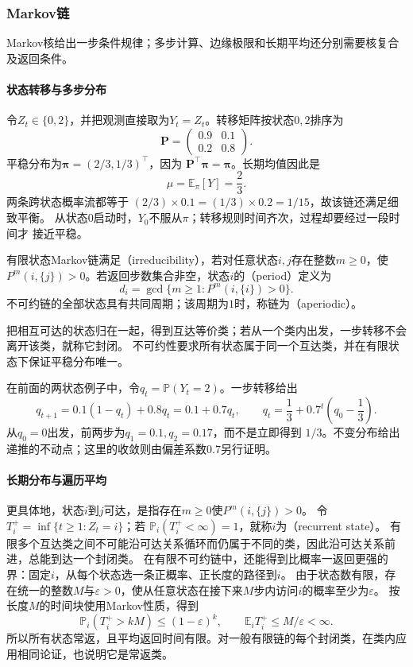 \subsubsection{Markov链}
\label{sec:stoch-markov-long-run-average}
Markov核给出一步条件规律；多步计算、边缘极限和长期平均还分别需要核复合及返回条件。

\paragraph{状态转移与多步分布}
\begin{example}[相关的两状态观测]
  \label{ex:stoch-two-state-chain}
  令$Z_t\in\{0,2\}$，并把观测直接取为$Y_t=Z_t$。转移矩阵按状态$0,2$排序为
  \[
    \bm{P}
    =
    \begin{pmatrix}
      0.9 & 0.1\\
      0.2 & 0.8
    \end{pmatrix}.
  \]
  平稳分布为$\bm{\pi}=(2/3,1/3)^\top$，因为
  $\bm{P}^{\top}\bm{\pi}=\bm{\pi}$。长期均值因此是
  \[
    \mu=\mathbb{E}_{\pi}[Y]=\frac23.
  \]
  两条跨状态概率流都等于
  $(2/3)\times0.1=(1/3)\times0.2=1/15$，故该链还满足细致平衡。
  从状态$0$启动时，$Y_0$不服从$\pi$；转移规则时间齐次，过程却要经过一段时间才
  接近平稳。
\end{example}
\begin{definition}[有限链的不可约性与周期]
  \label{def:stoch-finite-irreducibility-period}
  有限状态Markov链满足（irreducibility），若对任意状态\(i,j\)存在整数\(m\geq0\)，使\(P^m(i,\{j\})>0\)。若返回步数集合非空，状态\(i\)的（period）定义为
  \[ d_i=\gcd\{m\geq1:P^m(i,\{i\})>0\}. \]
  不可约链的全部状态具有共同周期；该周期为\(1\)时，称链为（aperiodic）。
\end{definition}
把相互可达的状态归在一起，得到互达等价类；若从一个类内出发，一步转移不会离开该类，就称它封闭。
不可约性要求所有状态属于同一个互达类，并在有限状态下保证平稳分布唯一。

在前面的两状态例子中，令\(q_t=\mathbb P(Y_t=2)\)。一步转移给出
\[
q_{t+1}=0.1(1-q_t)+0.8q_t=0.1+0.7q_t,
\qquad q_t=\frac13+0.7^t\left(q_0-\frac13\right).
\]
从\(q_0=0\)出发，前两步为\(q_1=0.1,q_2=0.17\)，而不是立即得到
\(1/3\)。不变分布给出递推的不动点；这里的收敛则由偏差系数\(0.7\)另行证明。

\paragraph{长期分布与遍历平均}
更具体地，状态\(i\)到\(j\)可达，是指存在\(m\geq0\)使\(P^m(i,\{j\})>0\)。
令\(T_i^+=\inf\{t\geq1:Z_t=i\}\)；若
$\mathbb{P}_i(T_i^+<\infty)=1$，就称$i$为（recurrent state）。
有限多个互达类之间不可能沿可达关系循环而仍属于不同的类，因此沿可达关系前进，总能到达一个封闭类。
在有限不可约链中，还能得到比概率一返回更强的界：固定$i$，从每个状态选一条正概率、正长度的路径到$i$。
由于状态数有限，存在统一的整数$M$与$\varepsilon>0$，使从任意状态在接下来$M$步内访问$i$的概率至少为$\varepsilon$。
按长度$M$的时间块使用Markov性质，得到
\[
 \mathbb P_i(T_i^+>kM)\leq(1-\varepsilon)^k,\qquad
 \mathbb E_iT_i^+\leq M/\varepsilon<\infty.
\]
所以所有状态常返，且平均返回时间有限。对一般有限链的每个封闭类，在类内应用相同论证，也说明它是常返类。

